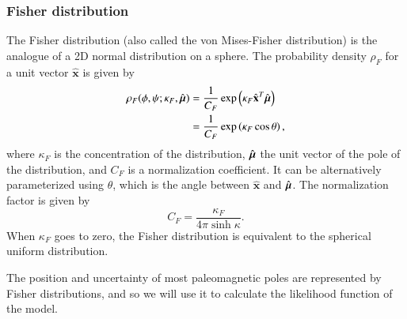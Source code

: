 \documentclass[preprint,12pt,authoryear]{elsarticle}
\newcommand{\mitbf}[1]{\hbox{\mathversion{bold}$#1$}}
\begin{document}
\subsubsection{Fisher distribution}
The Fisher distribution (also called the von Mises-Fisher distribution) is the analogue
of a 2D normal distribution on a sphere.
The probability density $\rho_F$ for a unit vector $\hat{\mathbf{x}}$ is given by
\begin{equation}
  \begin{aligned}
  \rho_F(\phi, \psi ; \kappa_F, \hat{\mitbf{\mu}}) 
  &= \frac{1}{C_F} \exp \left( \kappa_F \hat{\mathbf{x}}^T \hat{\mitbf{\mu}} \right) \\
  &= \frac{1}{C_F} \exp \left( \kappa_F \cos \theta \right),
  \end{aligned}
\end{equation}
where $\kappa_F$ is the concentration of the distribution, 
$\hat{\mitbf{\mu}}$ the unit vector of the pole of the distribution, 
and $C_F$ is a normalization coefficient. It can be alternatively
parameterized using $\theta$, which is the angle between $\hat{\mathbf{x}}$ and $\hat{\mitbf{\mu}}$.
The normalization factor is given by 
\begin{equation}
  C_F = \frac{\kappa_F}{4 \pi \sinh{\kappa}}.
\end{equation}
When $\kappa_F$ goes to zero, the Fisher distribution is equivalent to the spherical uniform distribution.

The position and uncertainty of most paleomagnetic poles are represented by Fisher distributions,
and so we will use it to calculate the likelihood function of the model.
\end{document}

